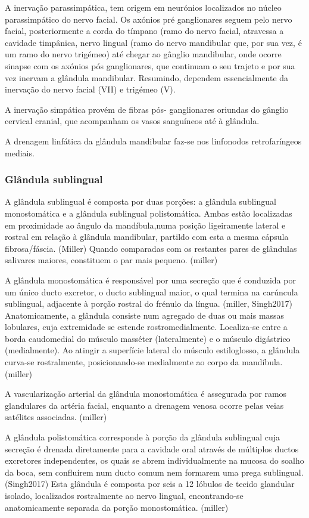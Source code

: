 A inervação parassimpática, tem origem em neurónios localizados no núcleo parassimpático do nervo facial. Os axónios pré ganglionares seguem pelo nervo facial, posteriormente a corda do tímpano (ramo do nervo facial, atravessa a cavidade timpânica, nervo lingual (ramo do nervo mandibular que, por sua vez, é um ramo do nervo trigémeo) até chegar ao gânglio mandibular, onde ocorre sinapse com os axónios pós ganglionares, que continuam o seu trajeto e por sua vez inervam a glândula mandibular. Resumindo, dependem essencialmente da inervação do nervo facial (VII) e trigémeo (V).


A inervação simpática provém de fibras pós- ganglionares  oriundas do gânglio cervical cranial, que acompanham os vasos sanguíneos até à glândula.


A drenagem linfática da glândula mandibular faz-se nos linfonodos retrofaríngeos mediais.

\subsubsection{Glândula sublingual}

A glândula sublingual é composta por duas porções: a glândula sublingual monostomática e a glândula sublingual polistomática. Ambas estão localizadas em proximidade ao ângulo da mandíbula,numa posição ligeiramente lateral e rostral em relação à glândula mandibular, partil\cite{Han2016}do com esta a mesma cápsula fibrosa/fáscia. (Miller) \cite{Brown2016} Quando comparadas com os restantes pares de glândulas salivares maiores, constituem o par mais pequeno. (miller)


A glândula monostomática é responsável por uma secreção que é conduzida por um único ducto excretor, o ducto sublingual maior, o qual termina na carúncula sublingual, adjacente à porção rostral do frénulo da língua. (miller, Singh2017) Anatomicamente, a glândula consiste num agregado de duas ou mais massas lobulares, cuja extremidade se estende rostromedialmente. Localiza-se entre a borda caudomedial do músculo masséter (lateralmente) e o músculo digástrico (medialmente). Ao atingir a superfície lateral do músculo estiloglosso, a glândula curva-se rostralmente, posicionando-se medialmente ao corpo da mandíbula. (miller)


A vascularização arterial da glândula monostomática é assegurada por ramos glandulares da artéria facial, enquanto a drenagem venosa ocorre pelas veias satélites associadas. (miller)


A glândula polistomática corresponde à porção da glândula sublingual cuja secreção é drenada diretamente para a cavidade oral através de múltiplos ductos excretores independentes, os quais se abrem individualmente na mucosa do soalho da boca, sem confluírem num ducto comum nem formarem uma prega sublingual. (Singh2017)\cite{lemmons2018} Esta glândula é composta por seis  a 12 lóbulos de tecido glandular isolado, localizados rostralmente ao nervo lingual, encontrando-se anatomicamente separada da porção monostomática. (miller)


